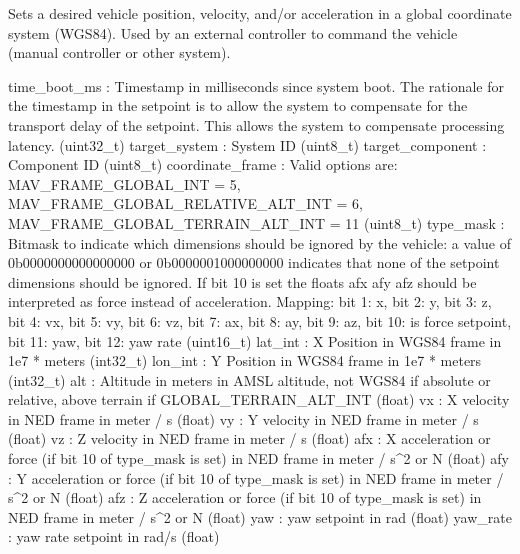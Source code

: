 \begin{DoxyVerb}
\begin{DoxyVerb}
\begin{DoxyVerb}
\begin{DoxyVerb}
\begin{DoxyVerb}
\begin{DoxyVerb}
\begin{DoxyVerb}
\begin{DoxyVerb}
\begin{DoxyVerb}
\begin{DoxyVerb}
\begin{DoxyVerb}Sets a desired vehicle position, velocity, and/or acceleration in a
global coordinate system (WGS84). Used by an external
controller to command the vehicle (manual controller
or other system).

time_boot_ms              : Timestamp in milliseconds since system boot. The rationale for the timestamp in the setpoint is to allow the system to compensate for the transport delay of the setpoint. This allows the system to compensate processing latency. (uint32_t)
target_system             : System ID (uint8_t)
target_component          : Component ID (uint8_t)
coordinate_frame          : Valid options are: MAV_FRAME_GLOBAL_INT = 5, MAV_FRAME_GLOBAL_RELATIVE_ALT_INT = 6, MAV_FRAME_GLOBAL_TERRAIN_ALT_INT = 11 (uint8_t)
type_mask                 : Bitmask to indicate which dimensions should be ignored by the vehicle: a value of 0b0000000000000000 or 0b0000001000000000 indicates that none of the setpoint dimensions should be ignored. If bit 10 is set the floats afx afy afz should be interpreted as force instead of acceleration. Mapping: bit 1: x, bit 2: y, bit 3: z, bit 4: vx, bit 5: vy, bit 6: vz, bit 7: ax, bit 8: ay, bit 9: az, bit 10: is force setpoint, bit 11: yaw, bit 12: yaw rate (uint16_t)
lat_int                   : X Position in WGS84 frame in 1e7 * meters (int32_t)
lon_int                   : Y Position in WGS84 frame in 1e7 * meters (int32_t)
alt                       : Altitude in meters in AMSL altitude, not WGS84 if absolute or relative, above terrain if GLOBAL_TERRAIN_ALT_INT (float)
vx                        : X velocity in NED frame in meter / s (float)
vy                        : Y velocity in NED frame in meter / s (float)
vz                        : Z velocity in NED frame in meter / s (float)
afx                       : X acceleration or force (if bit 10 of type_mask is set) in NED frame in meter / s^2 or N (float)
afy                       : Y acceleration or force (if bit 10 of type_mask is set) in NED frame in meter / s^2 or N (float)
afz                       : Z acceleration or force (if bit 10 of type_mask is set) in NED frame in meter / s^2 or N (float)
yaw                       : yaw setpoint in rad (float)
yaw_rate                  : yaw rate setpoint in rad/s (float)\end{DoxyVerb}
 \mbox{\label{classpymavlink_1_1dialects_1_1v10_1_1MAVLink_ab83c248e31d51f99fef1c801581d5b36}} 

\end{DoxyVerb}
\end{DoxyVerb}
\end{DoxyVerb}
\end{DoxyVerb}
\end{DoxyVerb}
\end{DoxyVerb}
\end{DoxyVerb}
\end{DoxyVerb}
\end{DoxyVerb}
\end{DoxyVerb}
